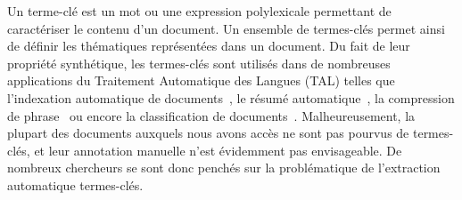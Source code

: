 

  Un terme-clé est un mot ou une expression polylexicale permettant de caractériser le contenu d'un document.
  Un ensemble de termes-clés permet ainsi de définir les thématiques représentées dans un document.
  Du fait de leur propriété synthétique, les termes-clés sont utilisés dans de nombreuses applications du Traitement Automatique des Langues (TAL) telles que l'indexation automatique de documents~\cite{medelyan2008smalltrainingset}, le résumé automatique~\cite{avanzo2005keyphrase}, la compression de phrase~\cite{boudin2013multisentencecompression} ou encore la classification de documents~\cite{han2007webdocumentclustering}.
  Malheureusement, la plupart des documents auxquels nous avons accès ne sont pas pourvus de termes-clés, et leur annotation manuelle n'est évidemment pas envisageable.
  De nombreux chercheurs se sont donc penchés sur la problématique de l'extraction automatique termes-clés.

